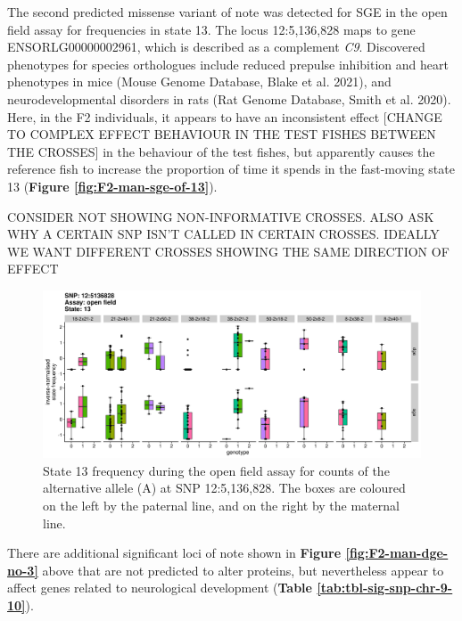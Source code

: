 \documentclass[
]{book}
\begin{document}
The second predicted missense variant of note was detected for SGE in the open field assay for frequencies in state 13. The locus 12:5,136,828 maps to gene ENSORLG00000002961, which is described as a complement \emph{C9}. Discovered phenotypes for species orthologues include reduced prepulse inhibition and heart phenotypes in mice (Mouse Genome Database, Blake et al. 2021), and neurodevelopmental disorders in rats (Rat Genome Database, Smith et al. 2020). Here, in the F2 individuals, it appears to have an inconsistent effect {[}CHANGE TO COMPLEX EFFECT BEHAVIOUR IN THE TEST FISHES BETWEEN THE CROSSES{]} in the behaviour of the test fishes, but apparently causes the reference fish to increase the proportion of time it spends in the fast-moving state 13 (\textbf{Figure \ref{fig:F2-man-sge-of-13}}).

CONSIDER NOT SHOWING NON-INFORMATIVE CROSSES. ALSO ASK WHY A CERTAIN SNP ISN'T CALLED IN CERTAIN CROSSES.
IDEALLY WE WANT DIFFERENT CROSSES SHOWING THE SAME DIRECTION OF EFFECT



\begin{figure}
\includegraphics[width=1\linewidth]{figs/mikk_behaviour/sig_snps_boxplots/13-12:5136828} \caption{State 13 frequency during the open field assay for counts of the alternative allele (A) at SNP 12:5,136,828. The boxes are coloured on the left by the paternal line, and on the right by the maternal line.}\label{fig:sig-snp-12-5mb}
\end{figure}

There are additional significant loci of note shown in \textbf{Figure \ref{fig:F2-man-dge-no-3}} above that are not predicted to alter proteins, but nevertheless appear to affect genes related to neurological development (\textbf{Table \ref{tab:tbl-sig-snp-chr-9-10}}).
\end{document}
